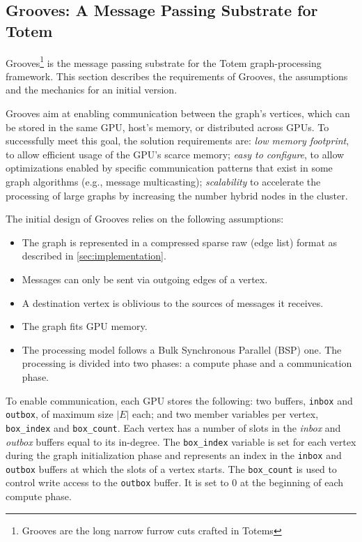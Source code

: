 \subsection{Grooves: A Message Passing Substrate for Totem}
\label{sec:grooves}

Grooves\footnote{Grooves are the long narrow furrow cuts crafted in Totems} is the message passing substrate for the Totem graph-processing framework. This section describes the requirements of Grooves, the assumptions and the mechanics for an initial version. 

Grooves aim at enabling communication between the graph's vertices, which can be stored in the same GPU, host's memory, or distributed across GPUs. To successfully meet this goal, the solution requirements are: \emph{low memory footprint}, to allow efficient usage of the GPU's scarce memory; \emph{easy to configure}, to allow optimizations enabled by specific communication patterns that exist in some graph algorithms (e.g., message multicasting); {\em scalability} to accelerate the processing of large graphs by increasing the number hybrid nodes in the cluster.

The initial design of Grooves relies on the following assumptions: 
\begin{itemize}
\item The graph is represented in a compressed sparse raw (edge list) format as described in \ref{sec:implementation}.
\item Messages can only be sent via outgoing edges of a vertex.
\item A destination vertex is oblivious to the sources of messages it receives.
\item The graph fits GPU memory.
\item The processing model follows a Bulk Synchronous Parallel (BSP) one. The processing is divided into two phases: a compute phase and a communication phase.
\end{itemize}

To enable communication, each GPU stores the following: two buffers, \texttt{inbox} and \texttt{outbox}, of maximum size $|E|$ each; and two member variables per vertex, \texttt{box\_index} and \texttt{box\_count}. Each vertex has a number of slots in the \emph{inbox} and \emph{outbox} buffers equal to its in-degree. The \texttt{box\_index} variable is set for each vertex during the graph initialization phase and represents an index in the \texttt{inbox} and \texttt{outbox} buffers at which the slots of a vertex starts. The \texttt{box\_count} is used to control write access to the \texttt{outbox} buffer. It is set to 0 at the beginning of each compute phase. 

